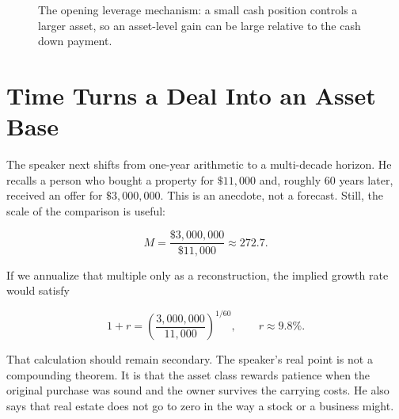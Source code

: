 \begin{figure}
\centering
{}
\caption{The opening leverage mechanism: a small cash position controls a larger asset, so an asset-level gain can be large relative to the cash down payment.}
\end{figure}

\section{Time Turns a Deal Into an Asset Base}

The speaker next shifts from one-year arithmetic to a multi-decade horizon. He recalls a person who bought a property for \(\$11{,}000\) and, roughly \(60\) years later, received an offer for \(\$3{,}000{,}000\). This is an anecdote, not a forecast. Still, the scale of the comparison is useful:

\begin{equation}
M
=
\frac{\$3{,}000{,}000}{\$11{,}000}
\approx 272.7.
\end{equation}

If we annualize that multiple only as a reconstruction, the implied growth rate would satisfy

\begin{equation}
1+r
=
\left(\frac{3{,}000{,}000}{11{,}000}\right)^{1/60},
\qquad
r \approx 9.8\%.
\end{equation}

That calculation should remain secondary. The speaker's real point is not a compounding theorem. It is that the asset class rewards patience when the original purchase was sound and the owner survives the carrying costs. He also says that real estate does not go to zero in the way a stock or a business might.

